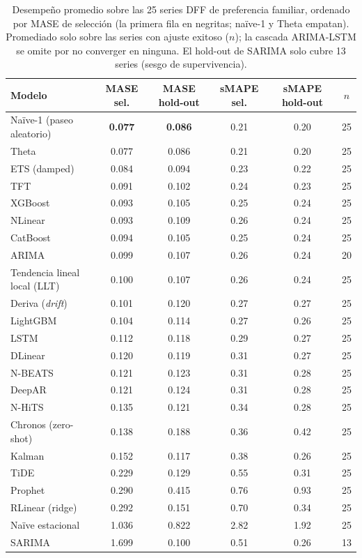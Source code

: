 \documentclass[12pt,letterpaper]{report}
\begin{document}
\begin{table}[H]
\centering
\footnotesize
\caption[Comparación de los \factNModels{} modelos (DFF)]{Desempeño promedio sobre las 25 series DFF
de preferencia familiar, ordenado por MASE de selección (la primera fila en negritas;
naïve-1 y Theta empatan). Promediado solo sobre las series con ajuste exitoso ($n$); la
cascada ARIMA-LSTM se omite por no converger en ninguna. El hold-out de SARIMA solo cubre
13 series (sesgo de supervivencia).}
\label{tab:comparacion_dff}
\setlength{\tabcolsep}{4pt}
\begin{tabular}{lccccc}
\toprule
\rowcolor{uacjblue!15}
\textbf{Modelo} & \textbf{MASE sel.} & \textbf{MASE hold-out} & \textbf{sMAPE sel.} & \textbf{sMAPE hold-out} & \textbf{$n$} \\ \midrule
Naïve-1 (paseo aleatorio) & \textbf{0.077} & \textbf{0.086} & 0.21 & 0.20 & 25 \\
Theta & 0.077 & 0.086 & 0.21 & 0.20 & 25 \\
ETS (damped) & 0.084 & 0.094 & 0.23 & 0.22 & 25 \\
TFT & 0.091 & 0.102 & 0.24 & 0.23 & 25 \\
XGBoost & 0.093 & 0.105 & 0.25 & 0.24 & 25 \\
NLinear & 0.093 & 0.109 & 0.26 & 0.24 & 25 \\
CatBoost & 0.094 & 0.105 & 0.25 & 0.24 & 25 \\
ARIMA & 0.099 & 0.107 & 0.26 & 0.24 & 20 \\
Tendencia lineal local (LLT) & 0.100 & 0.107 & 0.26 & 0.24 & 25 \\
Deriva (\textit{drift}) & 0.101 & 0.120 & 0.27 & 0.27 & 25 \\
LightGBM & 0.104 & 0.114 & 0.27 & 0.26 & 25 \\
LSTM & 0.112 & 0.118 & 0.29 & 0.27 & 25 \\
DLinear & 0.120 & 0.119 & 0.31 & 0.27 & 25 \\
N-BEATS & 0.121 & 0.123 & 0.31 & 0.28 & 25 \\
DeepAR & 0.121 & 0.124 & 0.31 & 0.28 & 25 \\
N-HiTS & 0.135 & 0.121 & 0.34 & 0.28 & 25 \\
Chronos (zero-shot) & 0.138 & 0.188 & 0.36 & 0.42 & 25 \\
Kalman & 0.152 & 0.117 & 0.38 & 0.26 & 25 \\
TiDE & 0.229 & 0.129 & 0.55 & 0.31 & 25 \\
Prophet & 0.290 & 0.415 & 0.76 & 0.93 & 25 \\
RLinear (ridge) & 0.292 & 0.151 & 0.70 & 0.34 & 25 \\
Naïve estacional & 1.036 & 0.822 & 2.82 & 1.92 & 25 \\
SARIMA & 1.699 & 0.100 & 0.51 & 0.26 & 13 \\
\bottomrule
\end{tabular}
\end{table}
\end{document}
